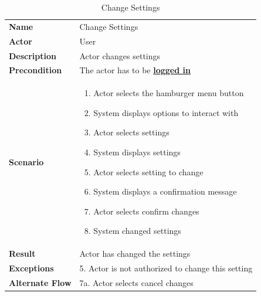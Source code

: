 \begin{table}[ht]
    \caption{Change Settings}
    \begin{tabular}{|L{5cm}|L{10cm}|}
        \toprule
        \textbf{Name}         & Change Settings                                               \\
        \textbf{Actor}        & User                                                          \\
        \textbf{Description}  & Actor changes settings                                        \\
        \textbf{Precondition} & The actor has to be \textbf{\hyperref[tab:table8]{logged in}} \\
        \textbf{Scenario} &
        \vspace{-0.75cm}
        \begin{enumerate}
            \setlength\itemsep{-0.5em}
            \item Actor selects the hamburger menu button
            \item System displays options to interact with
            \item Actor selects settings
            \item System displays settings
            \item Actor selects setting to change
            \item System displays a confirmation message
            \item Actor selects confirm changes
            \item System changed settings
        \end{enumerate} \\[-0.5cm]
        \textbf{Result}       & Actor has changed the settings                                \\
        \textbf{Exceptions} & 5.
        Actor is not authorized to change this setting \\
        \textbf{Alternate Flow} & 7a.
        Actor selects cancel changes \\
        \bottomrule
    \end{tabular}
    \label{tab:table13}
\end{table}

